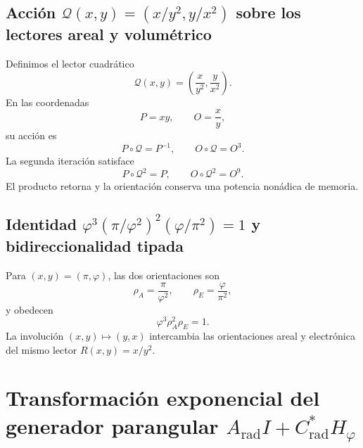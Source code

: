 \subsection{Acción \texorpdfstring{\(\mathcal Q(x,y)=(x/y^2,y/x^2)\)}{Q(x,y)=(x/y^2,y/x^2)} sobre los lectores areal y volumétrico}

Definimos el lector cuadrático
\begin{equation}
 \mathcal Q(x,y)
 =\left(\frac{x}{y^2},\frac{y}{x^2}\right).
 \label{eq:l9s102:euler-q}
\end{equation}
En las coordenadas
\begin{equation}
 P=xy,
 \qquad O=\frac{x}{y},
 \label{eq:l9s102:euler-po}
\end{equation}
su acción es
\begin{equation}
 P\circ\mathcal Q=P^{-1},
 \qquad
 O\circ\mathcal Q=O^3.
 \label{eq:l9s102:euler-q-action}
\end{equation}
La segunda iteración satisface
\begin{equation}
 \boxed{
 P\circ\mathcal Q^2=P,
 \qquad
 O\circ\mathcal Q^2=O^9.}
 \label{eq:l9s102:euler-q2}
\end{equation}
El producto retorna y la orientación conserva una potencia nonádica de
memoria.

\subsection{Identidad \texorpdfstring{\(\varphi^3(\pi/\varphi^2)^2(\varphi/\pi^2)=1\)}{phi^3(pi/phi^2)^2(phi/pi^2)=1} y bidireccionalidad tipada}

Para \((x,y)=(\pi,\varphi)\), las dos orientaciones son
\begin{equation}
 \rho_A=\frac{\pi}{\varphi^2},
 \qquad
 \rho_E=\frac{\varphi}{\pi^2},
 \label{eq:l9s102:euler-rho-a-e}
\end{equation}
y obedecen
\begin{equation}
 \boxed{\varphi^3\rho_A^2\rho_E=1.}
 \label{eq:l9s102:euler-ambivalencia-identidad}
\end{equation}
La involución \((x,y)\mapsto(y,x)\) intercambia las orientaciones areal y
electrónica del mismo lector \(R(x,y)=x/y^2\).

\section{Transformación exponencial del generador parangular \texorpdfstring{\(A_{\mathrm{rad}}I+C^*_{\mathrm{rad}}H_\varphi\)}{A_rad I+C*_rad H_phi}}
\label{sec:l9s102:euler-accion-par-angular}


